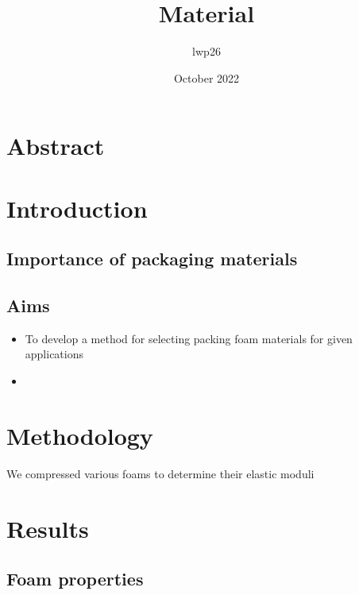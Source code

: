 \documentclass{article}
\begin{document}
\title{Material }
\author{lwp26 }
\date{October 2022}
\maketitle

\section{Abstract}

\section{Introduction}

\subsection{Importance of packaging materials}

\subsection{Aims}

\begin{itemize}
\item To develop a method for selecting packing foam materials for given applications
\item 
\end{itemize}

\section{Methodology}

We compressed various foams to determine their elastic moduli


\section{Results}


\subsection{Foam properties}
\end{document}
